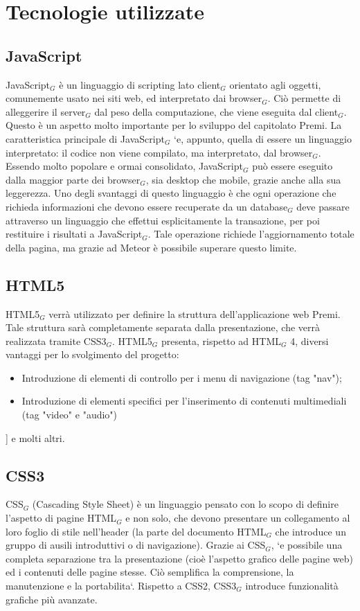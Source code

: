 \section{Tecnologie utilizzate}

\subsection{JavaScript}

JavaScript$_G$ è un linguaggio di scripting lato client$_G$ orientato agli oggetti, comunemente usato nei siti web, ed interpretato dai browser$_G$. Ciò permette di alleggerire il server$_G$ dal peso della computazione, che viene eseguita dal client$_G$. Questo è un aspetto molto importante per lo sviluppo del capitolato Premi. La caratteristica principale di JavaScript$_G$ `e, appunto, quella di essere un linguaggio interpretato: il codice non viene compilato, ma interpretato, dal browser$_G$. Essendo molto popolare e ormai consolidato, JavaScript$_G$ può essere eseguito dalla maggior parte dei browser$_G$, sia desktop che mobile, grazie anche alla sua leggerezza. Uno degli svantaggi di questo linguaggio è che ogni operazione che richieda informazioni che devono essere recuperate da un database$_G$ deve passare attraverso un linguaggio che effettui esplicitamente la transazione, per poi restituire i risultati a JavaScript$_G$. Tale operazione richiede l'aggiornamento totale della pagina, ma grazie ad Meteor è possibile superare questo limite.

\subsection{HTML5}

HTML5$_G$ verrà utilizzato per definire la struttura dell'applicazione web Premi. Tale struttura sarà completamente separata dalla presentazione, che verrà realizzata tramite CSS3$_G$. HTML5$_G$ presenta, rispetto ad HTML$_G$ 4, diversi vantaggi per lo svolgimento del progetto:
\begin{itemize}
\item Introduzione di elementi di controllo per i menu di navigazione (tag "nav");
\item Introduzione di elementi specifici per l'inserimento di contenuti multimediali (tag "video" e "audio")
\end{itemize}]
e molti altri.

\subsection{CSS3}
CSS$_G$ (Cascading Style Sheet) è un linguaggio pensato con lo scopo di definire l'aspetto di pagine HTML$_G$ e non solo, che devono presentare un collegamento al loro foglio di stile nell'header (la parte del documento HTML$_G$ che introduce un gruppo di ausili introduttivi o di navigazione). Grazie ai CSS$_G$, `e possibile una completa separazione tra la presentazione (cioè l'aspetto grafico delle pagine web) ed i contenuti delle pagine stesse. Ciò semplifica la comprensione, la manutenzione e la portabilita`. Rispetto a CSS2, CSS3$_G$ introduce funzionalità grafiche più avanzate.

